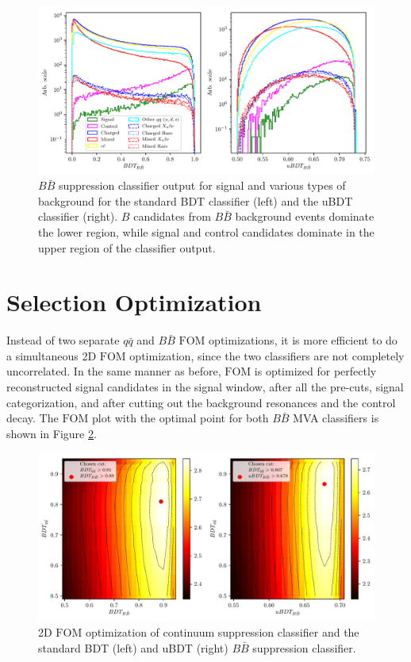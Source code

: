 \begin{figure}[H]
	\centering
	\captionsetup{width=0.8\linewidth}
	\includegraphics[width=\linewidth]{fig/bb_BDT}
	\caption{$B\bar B$ suppression classifier output for signal and various types of background for the standard BDT classifier (left) and the uBDT classifier (right). $B$ candidates from $B\bar B$ background events dominate the lower region, while signal and control candidates dominate in the upper region of the classifier output.}
	\label{fig:bbmva}
\end{figure}

\section{Selection Optimization}\label{sec:selection-optimization}

Instead of two separate $q \bar q$ and $B \bar B$ $\mathrm{FOM}$ optimizations, it is more efficient to do a simultaneous 2D $\mathrm{FOM}$ optimization, since the two classifiers are not completely uncorrelated. In the same manner as before, $\mathrm{FOM}$ is optimized for perfectly reconstructed signal candidates in the signal window, after all the pre-cuts, signal categorization, and after cutting out the background resonances and the control decay. The $\mathrm{FOM}$ plot with the optimal point for both $B \bar B$ MVA classifiers is shown in Figure \ref{fig:mvafom}.

\begin{figure}[H]
	\centering
	\captionsetup{width=0.8\linewidth}
	\includegraphics[width=\linewidth]{fig/mva_fom}
	\caption{2D $\mathrm{FOM}$ optimization of continuum suppression classifier and the standard BDT (left) and uBDT (right) $B\bar B$ suppression classifier.}
	\label{fig:mvafom}
\end{figure}

